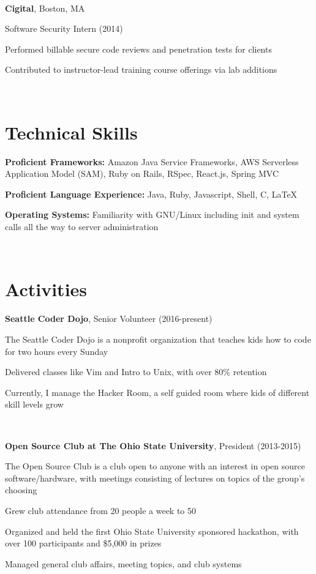 \documentclass[letterpaper]{resume}
\begin{document}
~

\textbf{Cigital}, Boston, MA

Software Security Intern (2014)
\begin{compactitem}
\item Performed billable secure code reviews and penetration tests for clients
\item Contributed to instructor-lead training course offerings via lab
    additions
\end{compactitem}

~

\section{Technical Skills}

\begin{compactitem}
\item
	\textbf{Proficient Frameworks:}
    Amazon Java Service Frameworks, AWS Serverless Application Model (SAM),
    Ruby on Rails, RSpec, React.js, Spring MVC

\item
	\textbf{Proficient Language Experience:}
    Java, Ruby, Javascript, Shell, C, \LaTeX

\item
    \textbf{Operating Systems:}
    Familiarity with GNU/Linux including init and system calls all the way to server administration
\end{compactitem}

~

\section{Activities}
\textbf{Seattle Coder Dojo}, Senior Volunteer (2016-present)
\begin{compactitem}

\item The Seattle Coder Dojo is a nonprofit organization that teaches kids how to code for two hours every Sunday
\item Delivered classes like Vim and Intro to Unix, with over 80\% retention
\item Currently, I manage the Hacker Room, a self guided room where kids of different skill levels grow
\end{compactitem}

~

\textbf{Open Source Club at The Ohio State University}, President (2013-2015)
\begin{compactitem}
\item The Open Source Club is a club open to anyone with an
	interest in open source software/hardware, with meetings consisting of
	lectures on topics of the group's choosing
\item Grew club attendance from 20 people a week to 50
\item Organized and held the first Ohio State University sponsored hackathon,
    with over 100 participants and \$5,000 in prizes
\item Managed general club affairs, meeting topics, and club systems
\end{compactitem}
\end{document}
